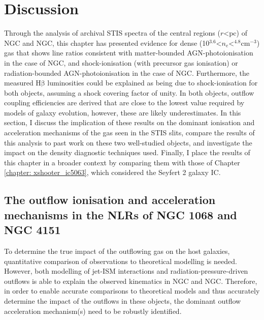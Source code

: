 \section{Discussion}
\label{section: stis_seyferts: discussion}

Through the analysis of archival STIS spectra of the central regions ($r$\;\textless{}\;pc) of NGC and NGC, this chapter has presented evidence for dense (10$^{3.6}$\;\textless\;$n_e$\;\textless{}$^{4.8}$\;cm$^{-3}$) gas that shows line ratios consistent with matter-bounded AGN-photoionisation in the case of NGC, and shock-ionisation (with precursor gas ionisation) or radiation-bounded AGN-photoionisation in the case of NGC. Furthermore, the measured H$\mathrm{\beta}$ luminosities could be explained as being due to shock-ionisation for both objects, assuming a shock covering factor of unity. In both objects, outflow coupling efficiencies are derived that are close to the lowest value required by models of galaxy evolution, however, these are likely underestimates. In this section, I discuss the implication of these results on the dominant ionisation and acceleration mechanisms of the gas seen in the STIS slits, compare the results of this analysis to past work on these two well-studied objects, and investigate the impact on the density diagnostic techniques used. Finally, I place the results of this chapter in a broader context by comparing them with those of Chapter \ref{chapter: xshooter_ic5063}, which considered the Seyfert 2 galaxy IC.

\subsection{The outflow ionisation and acceleration mechanisms in the NLRs of NGC 1068 and NGC 4151}
\label{section: stis_seyferts: disc-ionisation}

To determine the true impact of the outflowing gas on the host galaxies, quantitative comparison of observations to theoretical modelling is needed. However, both modelling of jet-ISM interactions  \citep{Capetti1997, Axon1998, May2017, May2020} and radiation-pressure-driven outflows \citep{Crenshaw2000_N4151, Crenshaw2000_N1068, Das2005, Das2006, Revalski2021, Meena2023} is able to explain the observed kinematics in NGC and NGC. Therefore, in order to enable accurate comparisons to theoretical models and thus accurately determine the impact of the outflows in these objects, the dominant outflow acceleration mechanism(s) need to be robustly identified.

